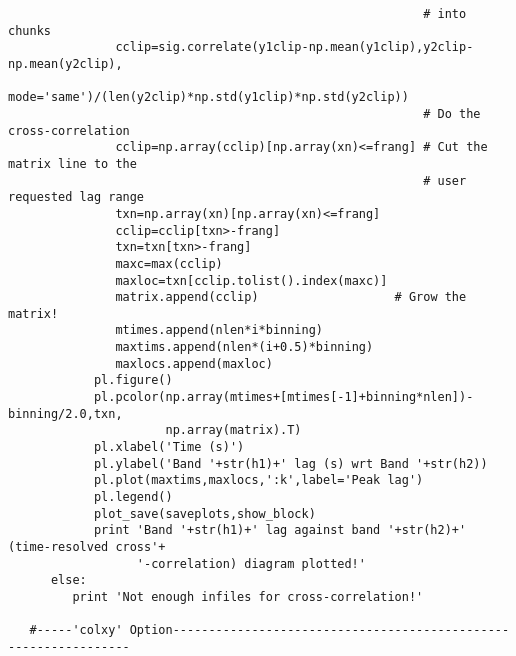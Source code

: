 \begin{verbatim}
                                                          # into chunks
               cclip=sig.correlate(y1clip-np.mean(y1clip),y2clip-np.mean(y2clip),
                               mode='same')/(len(y2clip)*np.std(y1clip)*np.std(y2clip))
                                                          # Do the cross-correlation
               cclip=np.array(cclip)[np.array(xn)<=frang] # Cut the matrix line to the
                                                          # user requested lag range
               txn=np.array(xn)[np.array(xn)<=frang]
               cclip=cclip[txn>-frang]
               txn=txn[txn>-frang]  
               maxc=max(cclip)
               maxloc=txn[cclip.tolist().index(maxc)]
               matrix.append(cclip)                   # Grow the matrix!
               mtimes.append(nlen*i*binning)
               maxtims.append(nlen*(i+0.5)*binning)
               maxlocs.append(maxloc)
            pl.figure()
            pl.pcolor(np.array(mtimes+[mtimes[-1]+binning*nlen])-binning/2.0,txn,
                      np.array(matrix).T)
            pl.xlabel('Time (s)')
            pl.ylabel('Band '+str(h1)+' lag (s) wrt Band '+str(h2))
            pl.plot(maxtims,maxlocs,':k',label='Peak lag')
            pl.legend()
            plot_save(saveplots,show_block)
            print 'Band '+str(h1)+' lag against band '+str(h2)+' (time-resolved cross'+
                  '-correlation) diagram plotted!'
      else:
         print 'Not enough infiles for cross-correlation!'

   #-----'colxy' Option----------------------------------------------------------------


\end{verbatim}
